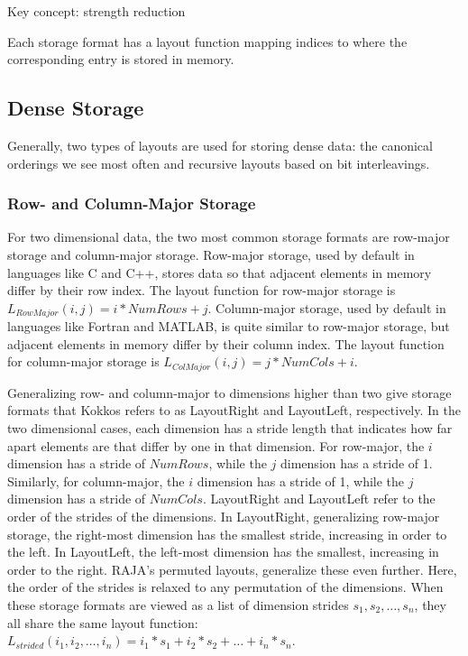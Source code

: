 Key concept: strength reduction

Each storage format has a layout function mapping indices to where the corresponding entry is stored in memory.

\subsection{Dense Storage}

Generally, two types of layouts are used for storing dense data: the canonical orderings we see most often and recursive layouts based on bit interleavings.

\subsubsection{Row- and Column-Major Storage}
For two dimensional data, the two most common storage formats are row-major storage and column-major storage.
Row-major storage, used by default in languages like C and C++, stores data so that adjacent elements in memory differ by their row index. 
The layout function for row-major storage is $L_{RowMajor}(i,j) = i * NumRows + j$.
Column-major storage, used by default in languages like Fortran and MATLAB, is quite similar to row-major storage, but adjacent elements in memory differ by their column index.
The layout function for column-major storage is $L_{ColMajor}(i,j) = j * NumCols + i$.

Generalizing row- and column-major to dimensions higher than two give storage formats that Kokkos refers to as LayoutRight and LayoutLeft, respectively. 
In the two dimensional cases, each dimension has a stride length that indicates how far apart elements are that differ by one in that dimension.
For row-major, the $i$ dimension has a stride of $NumRows$, while the $j$ dimension has a stride of 1.
Similarly, for column-major, the $i$ dimension has a stride of 1, while the $j$ dimension has a stride of $NumCols$.
LayoutRight and LayoutLeft refer to the order of the strides of the dimensions.
In LayoutRight, generalizing row-major storage, the right-most dimension has the smallest stride, increasing in order to the left.
In LayoutLeft, the left-most dimension has the smallest, increasing in order to the right.
RAJA's permuted layouts, generalize these even further.
Here, the order of the strides is relaxed to any permutation of the dimensions.
When these storage formats are viewed as a list of dimension strides $s_1,s_2,\dots,s_n$, they all share the same layout function: $L_{strided} (i_1,i_2,\dots,i_n) = i_1 * s_1 + i_2 * s_2 + \dots + i_n * s_n$.


